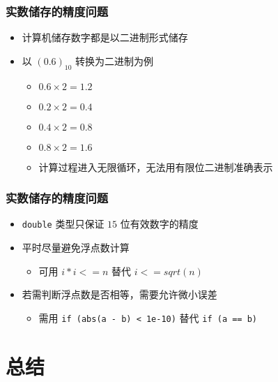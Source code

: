 \begin{frame}[fragile]
    \frametitle{实数储存的精度问题}

    \begin{itemize}[<+->]
        \item 计算机储存数字都是以二进制形式储存
        \item 以 $(0.6)_{10}$ 转换为二进制为例
        \begin{itemize}
            \item $0.6 \times 2 = 1.2$
            \item $0.2 \times 2 = 0.4$
            \item $0.4 \times 2 = 0.8$
            \item $0.8 \times 2 = 1.6$
            \item 计算过程进入无限循环，无法用有限位二进制准确表示
        \end{itemize}
    \end{itemize}

\end{frame}

\begin{frame}[fragile]
    \frametitle{实数储存的精度问题}

    \begin{itemize}[<+->]
        \item \lstinline|double| 类型只保证 $15$ 位有效数字的精度
        \item 平时尽量避免浮点数计算
        \begin{itemize}
            \item 可用 $i * i <= n$ 替代 $i <= sqrt(n)$
        \end{itemize}
        \item 若需判断浮点数是否相等，需要允许微小误差
        \begin{itemize}
            \item 需用 \lstinline|if (abs(a - b) < 1e-10)| 替代 \lstinline|if (a == b)|
        \end{itemize}
    \end{itemize}

\end{frame}

\section{总结}

